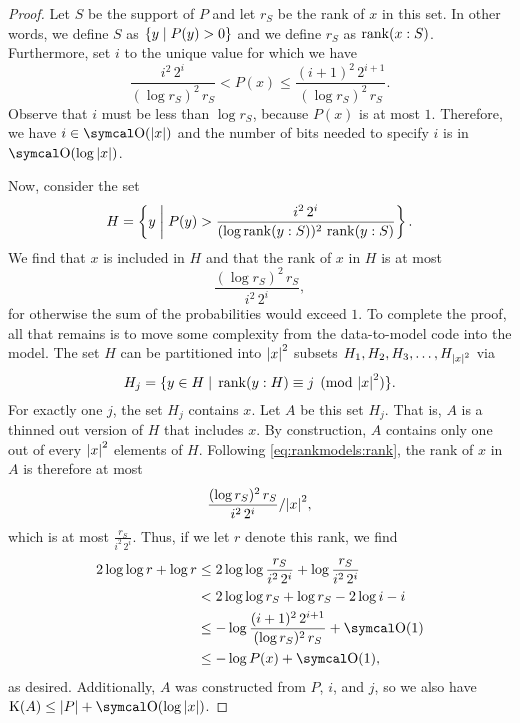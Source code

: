 \begin{proof}
  Let $S$ be the support of $P$ and let $r_S$ be the rank of $x$ in this set.
  In other words, we define $S$ as $\{y \st P(y) > 0\}$ and we define $r_S$ as $\rank(x : S)$.
  Furthermore, set $i$ to the unique value for which we have
  \begin{equation*}
    \frac{i^2\, 2^i}{(\log r_S)^2\, r_S} < P(x) \le \frac{(i + 1)^2\, 2^{i + 1}}{(\log r_S)^2\, r_S}.
  \end{equation*}
  Observe that $i$ must be less than $\log r_S$, because $P(x)$ is at most $1$.
  Therefore, we have $i \in \bigO(\length{x})$ and the number of bits needed to specify $i$ is in $\bigO(\log \length{x})$.

  Now, consider the set
  \begin{equation*}
    H \deq \left\{y \st[\middle] P(y) > \frac{i^2\, 2^i}{(\log \rank(y : S))^2\, \rank(y : S)}\right\}.
  \end{equation*}
  We find that $x$ is included in $H$ and that the rank of $x$ in $H$ is at most
  \begin{equation}
  \label{eq:rankmodels:rank}
    \frac{(\log r_S)^2\, r_S}{i^2\, 2^i},
  \end{equation}
  for otherwise the sum of the probabilities would exceed $1$.
  To complete the proof, all that remains is to move some complexity from the data-to-model code into the model.
  The set $H$ can be partitioned into $\length{x}^2$ subsets $H_1, H_2, H_3, \ldots, H_{\length{x}^2}$ via
  \begin{equation*}
    H_j \deq \{y \in H \st \rank(y : H) \equiv j \pmod{\length{x}^2}\}.
  \end{equation*}
  For exactly one $j$, the set $H_j$ contains $x$.
  Let $A$ be this set $H_j$.
  That is, $A$ is a thinned out version of $H$ that includes $x$.
  By construction, $A$ contains only one out of every $\length{x}^2$ elements of $H$.
  Following \eqref{eq:rankmodels:rank}, the rank of $x$ in $A$ is therefore at most
  \begin{equation*}
    \frac{(\log r_S)^2\, r_S}{i^2\, 2^i} / \length{x}^2,
  \end{equation*}
  which is at most $\frac{r_S}{i^2\, 2^i}$.
  Thus, if we let $r$ denote this rank, we find
  \begin{align*}
    2 \log \log r + \log r &\le 2 \log \log \frac{r_S}{i^2\, 2^i} + \log \frac{r_S}{i^2\, 2^i} \\
    	&< 2 \log \log r_S + \log r_S - 2 \log i - i \\
    	&\le -\log \frac{(i + 1)^2\, 2^{i + 1}}{(\log r_S)^2\, r_S} + \bigO(1) \\
    	&\le -\log P(x) + \bigO(1),
  \end{align*}
  as desired.
  Additionally, $A$ was constructed from $P$, $i$, and $j$, so we also have $\KC(A) \le \length{P} + \bigO(\log \length{x})$.
\end{proof}


